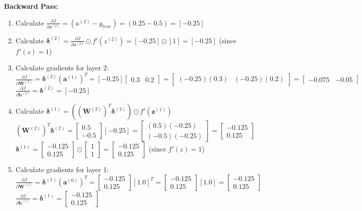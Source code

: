\documentclass{article}
\newcommand{\bW}{\bm{W}}
\newcommand{\bb}{\bm{b}}
\newcommand{\bz}{\bm{z}}
\newcommand{\ba}{\bm{a}}
\newcommand{\bdelta}{\bm{\delta}}
\begin{document}
\textbf{Backward Pass:}
\begin{enumerate}
    \item Calculate $\frac{\partial J}{\partial a^{(2)}} = (a^{(2)} - y_{true}) = (0.25 - 0.5) = [-0.25]$
    \item Calculate $\bdelta^{(2)} = \frac{\partial J}{\partial a^{(2)}} \odot f'(z^{(2)}) = [-0.25] \odot [1] = [-0.25]$ (since $f'(z)=1$)
    \item Calculate gradients for layer 2:
        $\frac{\partial J}{\partial \bW^{(2)}} = \bdelta^{(2)} (\ba^{(1)})^T = [-0.25] \begin{bmatrix} 0.3 & 0.2 \end{bmatrix} = \begin{bmatrix} (-0.25)(0.3) & (-0.25)(0.2) \end{bmatrix} = \begin{bmatrix} -0.075 & -0.05 \end{bmatrix}$
        $\frac{\partial J}{\partial \bb^{(2)}} = \bdelta^{(2)} = [-0.25]$
    \item Calculate $\bdelta^{(1)} = ((\bW^{(2)})^T \bdelta^{(2)}) \odot f'(\bz^{(1)})$
        $(\bW^{(2)})^T \bdelta^{(2)} = \begin{bmatrix} 0.5 \\ -0.5 \end{bmatrix} [-0.25] = \begin{bmatrix} (0.5)(-0.25) \\ (-0.5)(-0.25) \end{bmatrix} = \begin{bmatrix} -0.125 \\ 0.125 \end{bmatrix}$
        $\bdelta^{(1)} = \begin{bmatrix} -0.125 \\ 0.125 \end{bmatrix} \odot \begin{bmatrix} 1 \\ 1 \end{bmatrix} = \begin{bmatrix} -0.125 \\ 0.125 \end{bmatrix}$ (since $f'(z)=1$)
    \item Calculate gradients for layer 1:
        $\frac{\partial J}{\partial \bW^{(1)}} = \bdelta^{(1)} (\ba^{(0)})^T = \begin{bmatrix} -0.125 \\ 0.125 \end{bmatrix} [1.0]^T = \begin{bmatrix} -0.125 \\ 0.125 \end{bmatrix} [1.0] = \begin{bmatrix} -0.125 \\ 0.125 \end{bmatrix}$
        $\frac{\partial J}{\partial \bb^{(1)}} = \bdelta^{(1)} = \begin{bmatrix} -0.125 \\ 0.125 \end{bmatrix}$
\end{enumerate}
\end{document}
